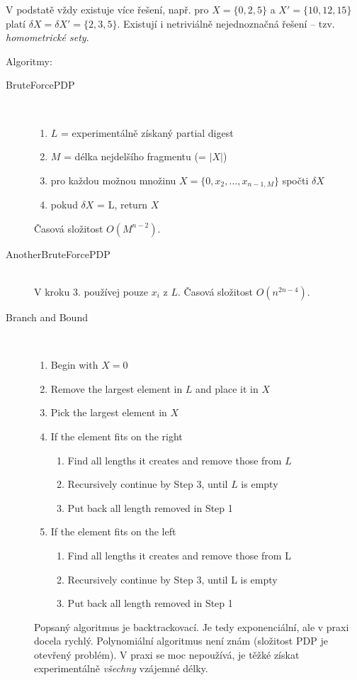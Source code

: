 \documentclass[11pt]{report} %
\numberwithin{equation}{section}
\begin{document}
\begin{description}
	V podstatě vždy existuje více řešení, např. pro $X = \{0, 2, 5\}$ a $X' = \{10, 12, 15\}$ platí $\delta X = \delta X' = \{2,3,5\}$. Existují i netriviálně nejednoznačná řešení -- tzv. \textit{homometrické sety}.
	
	Algoritmy:
	\begin{description}
		\item[BruteForcePDP]~
		\begin{enumerate}
			\item $L$ = experimentálně získaný partial digest
			\item $M$ = délka nejdelšího fragmentu (= $|X|$)
			\item pro každou možnou množinu $X = \{0, x_2, \dots, x_{n-1, M}\}$ spočti $\delta X$
			\item pokud $\delta X$ = L, return $X$
		\end{enumerate}
		Časová složitost $O(M^{n-2})$.
		
		\item[AnotherBruteForcePDP]~\\
		 V kroku 3. používej pouze $x_i$ z $L$. Časová složitost $O(n^{2n-4})$.
		
		\item[Branch and Bound]~
		\begin{enumerate}
			\item Begin with $X = {0}$
			\item Remove the largest element in $L$ and place it in $X$
			\item Pick the largest element in $X$
			\item If the element fits on the right
			\begin{enumerate}
				\item Find all lengths it creates and remove those from $L$
				\item Recursively continue by Step 3, until $L$ is empty
				\item Put back all length removed in Step 1
			\end{enumerate}
			\item If the element fits on the left
			\begin{enumerate}
				\item Find all lengths it creates and remove those from L
				\item Recursively continue by Step 3, until L is empty
				\item Put back all length removed in Step 1
			\end{enumerate}
		\end{enumerate}
		Popsaný algoritmus je backtrackovací. Je tedy exponenciální, ale v praxi docela rychlý. Polynomiální algoritmus není znám (složitost PDP je otevřený problém). V praxi se moc nepoužívá, je těžké získat experimentálně \textit{všechny} vzájemné délky.
		

\end{description}
\end{description}
\end{document}
